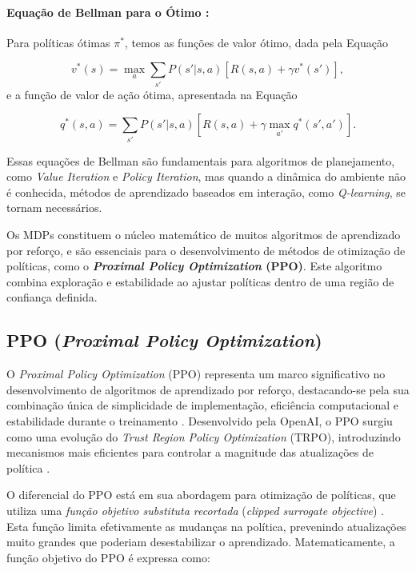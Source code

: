 \paragraph{Equação de Bellman para o Ótimo \cite{sutton}:}
Para políticas ótimas \(\pi^*\), temos as funções de valor ótimo, dada pela Equação 

\begin{equation}
\label{eq:bellman_otimo_estado}
v^*(s) = \max_a \sum_{s'} P(s'|s, a) \left[ R(s, a) + \gamma v^*(s') \right], 
\end{equation} 
e a função de valor de ação ótima, apresentada na Equação 

\begin{equation}
\label{eq:bellman_otimo_acao}
q^*(s, a) = \sum_{s'} P(s'|s, a) \left[ R(s, a) + \gamma \max_{a'} q^*(s', a') \right].
\end{equation}

Essas equações de Bellman são fundamentais para algoritmos de planejamento, como \textit{Value Iteration} e \textit{Policy Iteration}, mas quando a dinâmica do ambiente não é conhecida, métodos de aprendizado baseados em interação, como \textit{Q-learning}, se tornam necessários.

Os MDPs constituem o núcleo matemático de muitos algoritmos de aprendizado por reforço, e são essenciais para o desenvolvimento de métodos de otimização de políticas, como o \textbf{\textit{Proximal Policy Optimization} (PPO)}. Este algoritmo combina exploração e estabilidade ao ajustar políticas dentro de uma região de confiança definida.

\subsection{PPO (\textit{Proximal Policy Optimization})}
\label{subsec:ppo}

O \textit{Proximal Policy Optimization} (PPO) representa um marco significativo no desenvolvimento de algoritmos de aprendizado por reforço, destacando-se pela sua combinação única de simplicidade de implementação, eficiência computacional e estabilidade durante o treinamento \cite{PPO}. Desenvolvido pela OpenAI, o PPO surgiu como uma evolução do \textit{Trust Region Policy Optimization} (TRPO), introduzindo mecanismos mais eficientes para controlar a magnitude das atualizações de política \cite{openia_ppo_doc}.

O diferencial do PPO está em sua abordagem para otimização de políticas, que utiliza uma \textit{função objetivo substituta recortada} (\textit{clipped surrogate objective}) \cite{PPO, openia_ppo_doc}. Esta função limita efetivamente as mudanças na política, prevenindo atualizações muito grandes que poderiam desestabilizar o aprendizado. Matematicamente, a função objetivo do PPO é expressa como:

